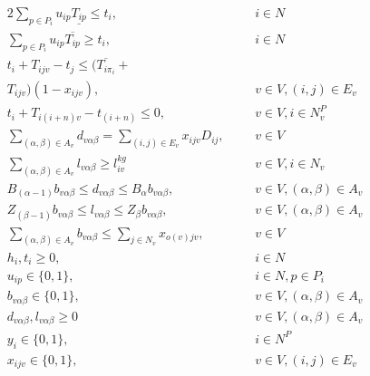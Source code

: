 \documentclass[../main.tex]{subfiles}
\begin{document}
\begin{alignat} {2}
    \sum_{p\in P_i} u_{ip}\underline{T_{ip}} \leq t_{i},		& 	&&	i \in N 					\label{eq:17}	\\[4pt]
    \sum_{p\in P_i} u_{ip}\overline{T_{ip}} \geq t_{i},			& 	&& 	i \in N 					\label{eq:18}	\\[4pt]
    t_{i} + T_{ijv} - t_{j} \leq (\overline{T_{i\pi_i}} + 		& 	&&						\nonumber\\
    T_{ijv})(1 - x_{ijv}),						& 	&& 	v \in V, (i,j) \in E_v				\label{eq:19}	\\[8pt]
    t_{i} + T_{i(i+n)v} - t_{(i+n)} \leq 0,				& 	&& 	v \in V, i \in N_v^P				\label{eq:20}	\\[8pt]
    \sum_{(\alpha,\beta)\in A_v}d_{v\alpha\beta} = 
    \sum_{(i,j) \in E_v} x_{ijv}D_{ij},					& 	&&	v \in V						\label{eq:21}	\\[4pt]
    \sum_{(\alpha,\beta) \in A_v} l_{v\alpha\beta} \geq l_{iv}^{kg}	&	&& 	v \in V, i \in N_v				\label{eq:22}	\\[4pt]
    B_{(\alpha-1)}b_{v\alpha\beta} \leq d_{v\alpha\beta} \leq 
    B_\alpha b_{v\alpha\beta},				        	& 	&&	v \in V, (\alpha, \beta) \in A_v		\label{eq:23}	\\[8pt]
    Z_{(\beta-1)}b_{v\alpha\beta} \leq l_{v\alpha\beta} \leq 
    Z_\beta b_{v\alpha\beta},				        	& 	&&	v \in V, (\alpha, \beta) \in A_v		\label{eq:24}	\\[8pt]   	
    \sum_{(\alpha, \beta) \in A_v} b_{v\alpha\beta} \leq		
    \sum_{j\in N_v}x_{o(v)jv},                                          & 	&&	v \in V						\label{eq:25}	\\[4pt]
    h_i, t_i \geq 0,							& 	&&	i \in N 					\label{eq:26}	\\[8pt]
    u_{ip} \in \{0, 1\},						& 	&&	i \in N, p \in P_i 				\label{eq:27}	\\[8pt]
    b_{v\alpha\beta} \in \{0, 1\},					& 	&&	v \in V, (\alpha,\beta) \in A_v 		\label{eq:28}	\\[8pt]
    d_{v\alpha\beta}, l_{v\alpha\beta} \geq 0                           &       &&      v \in V, (\alpha,\beta) \in A_v 		\label{eq:29}	\\[8pt]
    y_i \in \{0, 1\},                                                   &       &&      i \in N^P                                       \label{eq:30}   \\[8pt]
    x_{ijv} \in \{0, 1\},						&	&&	v \in V, (i, j) \in E_v 			\label{eq:31}
\end{alignat} 
\endgroup
\end{document}
